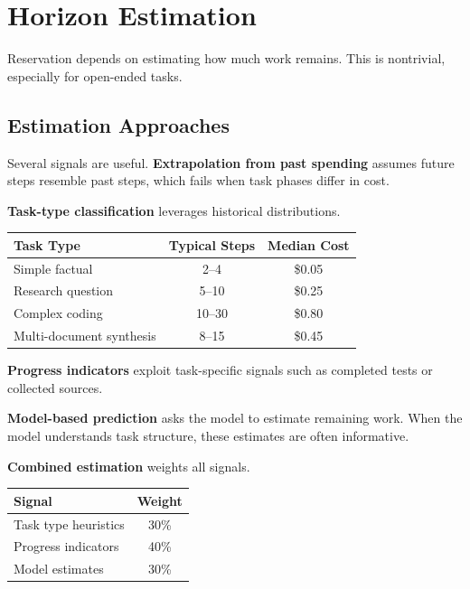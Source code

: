 \section{Horizon Estimation}

Reservation depends on estimating how much work remains. This is nontrivial, especially for open-ended tasks.

\subsection{Estimation Approaches}

Several signals are useful. \textbf{Extrapolation from past spending} assumes future steps resemble past steps, which fails when task phases differ in cost.

\textbf{Task-type classification} leverages historical distributions.

\begin{center}
\begin{tabular}{lcc}
\toprule
Task Type & Typical Steps & Median Cost \\
\midrule
Simple factual & 2--4 & \$0.05 \\
Research question & 5--10 & \$0.25 \\
Complex coding & 10--30 & \$0.80 \\
Multi-document synthesis & 8--15 & \$0.45 \\
\bottomrule
\end{tabular}
\end{center}

\textbf{Progress indicators} exploit task-specific signals such as completed tests or collected sources.

\textbf{Model-based prediction} asks the model to estimate remaining work. When the model understands task structure, these estimates are often informative.

\textbf{Combined estimation} weights all signals.

\begin{center}
\begin{tabular}{lc}
\toprule
Signal & Weight \\
\midrule
Task type heuristics & 30\% \\
Progress indicators & 40\% \\
Model estimates & 30\% \\
\bottomrule
\end{tabular}
\end{center}

